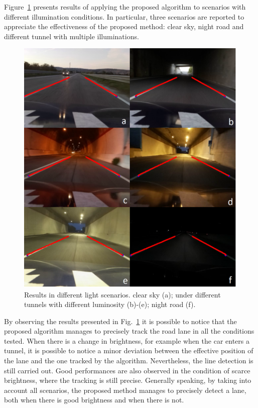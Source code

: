 Figure~\ref{fig:ITS_results} presents results of applying the proposed algorithm to scenarios with different illumination conditions. In particular, three scenarios are reported to appreciate the effectiveness of the proposed method: clear sky, night road and different tunnel with multiple illuminations.  

\begin{figure}[ht]
	\centering
	\includegraphics[scale=0.45]{figure/Part1/Chapter4/figures/test_final_letter.png}
	\caption{Results in different light scenarios. clear sky  (a); under different tunnels with different luminosity (b)-(e); night road (f).}
	\label{fig:ITS_results}
\end{figure}

By observing the results presented in Fig.~\ref{fig:ITS_results} it is possible to notice that the proposed algorithm manages to precisely track the road lane in all the conditions tested. When there is a change in brightness, for example when the car enters a tunnel, it is possible to notice a minor deviation between the effective position of the lane and the one tracked by the algorithm. Nevertheless, the line detection is still carried out. Good performances are also observed in the condition of scarce brightness, where the tracking is still precise. 
Generally speaking, by taking into account all scenarios, the proposed method manages to precisely detect a lane, both when there is good brightness and when there is not.


